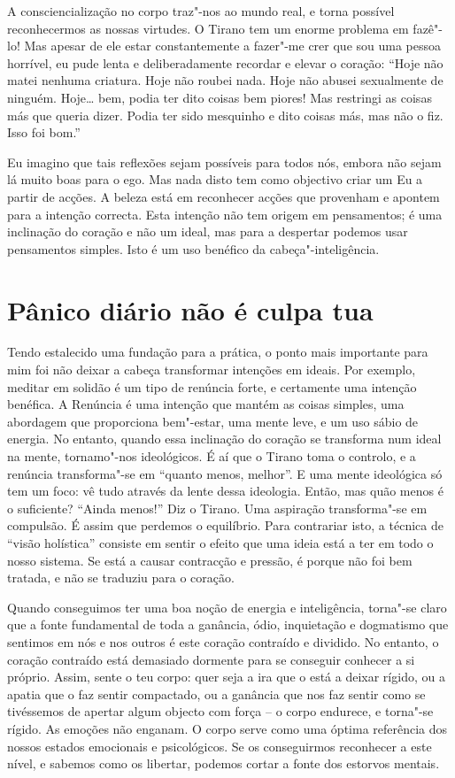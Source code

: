 \enlargethispage*{\baselineskip}

A consciencialização no corpo traz"-nos ao mundo real, e torna possível
reconhecermos as nossas virtudes. O Tirano tem um enorme problema em
fazê"-lo! Mas apesar de ele estar constantemente a fazer"-me crer que sou
uma pessoa horrível, eu pude lenta e deliberadamente recordar e elevar o
coração: “Hoje não matei nenhuma criatura. Hoje não roubei nada. Hoje
não abusei sexualmente de ninguém. Hoje\ldots{} bem, podia ter dito coisas
bem piores! Mas restringi as coisas más que queria dizer. Podia ter sido
mesquinho e dito coisas más, mas não o fiz. Isso foi bom.”

Eu imagino que tais reflexões sejam possíveis para todos nós, embora não
sejam lá muito boas para o ego. Mas nada disto tem como objectivo criar
um Eu a partir de acções. A beleza está em reconhecer acções que
provenham e apontem para a intenção correcta. Esta intenção não tem
origem em pensamentos; é uma inclinação do coração e não um ideal, mas
para a despertar podemos usar pensamentos simples. Isto é um uso
benéfico da cabeça"-inteligência.

\section{Pânico diário não é culpa tua}

Tendo estalecido uma fundação para a prática, o ponto mais importante
para mim foi não deixar a cabeça transformar intenções em ideais. Por
exemplo, meditar em solidão é um tipo de renúncia forte, e certamente
uma intenção benéfica. A Renúncia é uma intenção que mantém as coisas
simples, uma abordagem que proporciona bem"-estar, uma mente leve, e um
uso sábio de energia. No entanto, quando essa inclinação do coração se
transforma num ideal na mente, tornamo"-nos ideológicos. É aí que o
Tirano toma o controlo, e a renúncia transforma"-se em “quanto menos,
melhor”. E uma mente ideológica só tem um foco: vê tudo através da lente
dessa ideologia. Então, mas quão menos é o suficiente? “Ainda menos!”
Diz o Tirano. Uma aspiração transforma"-se em compulsão. É assim que
perdemos o equilíbrio. Para contrariar isto, a técnica de “visão
holística” consiste em sentir o efeito que uma ideia está a ter em todo
o nosso sistema. Se está a causar contracção e pressão, é porque não foi
bem tratada, e não se traduziu para o coração.

Quando conseguimos ter uma boa noção de energia e inteligência, torna"-se
claro que a fonte fundamental de toda a ganância, ódio, inquietação e
dogmatismo que sentimos em nós e nos outros é este coração contraído e
dividido. No entanto, o coração contraído está demasiado dormente para
se conseguir conhecer a si próprio. Assim, sente o teu corpo: quer seja
a ira que o está a deixar rígido, ou a apatia que o faz sentir
compactado, ou a ganância que nos faz sentir como se tivéssemos de
apertar algum objecto com força -- o corpo endurece, e torna"-se rígido.
As emoções não enganam. O corpo serve como uma óptima referência dos
nossos estados emocionais e psicológicos. Se os conseguirmos reconhecer
a este nível, e sabemos como os libertar, podemos cortar a fonte dos
estorvos mentais.

